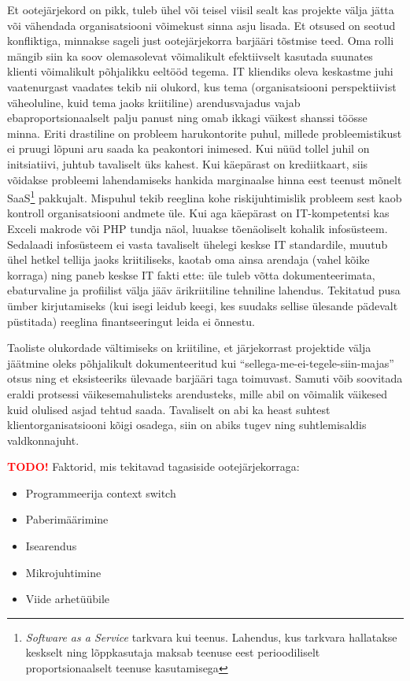 \documentclass{tufte-book}
\newcommand{\TODO}{\textcolor{red}{\bf TODO!}\xspace}
\begin{document}
Et ootejärjekord on pikk, tuleb ühel või teisel viisil sealt kas projekte välja jätta või vähendada organisatsiooni võimekust sinna asju lisada. Et otsused on seotud konfliktiga, minnakse sageli just ootejärjekorra barjääri tõstmise teed. Oma rolli mängib siin ka soov olemasolevat võimalikult efektiivselt kasutada suunates klienti võimalikult põhjalikku eeltööd tegema. IT kliendiks oleva keskastme juhi vaatenurgast vaadates tekib nii olukord, kus tema (organisatsiooni perspektiivist väheoluline, kuid tema jaoks kriitiline) arendusvajadus vajab ebaproportsionaalselt palju panust ning omab ikkagi väikest shanssi töösse minna. Eriti drastiline on probleem harukontorite puhul, millede probleemistikust ei pruugi lõpuni aru saada ka peakontori inimesed. Kui nüüd tollel juhil on initsiatiivi, juhtub tavaliselt üks kahest. Kui käepärast on krediitkaart, siis võidakse probleemi lahendamiseks hankida marginaalse hinna eest teenust mõnelt SaaS\footnote{\emph{Software as a Service} tarkvara kui teenus. Lahendus, kus tarkvara hallatakse keskselt ning lõppkasutaja maksab teenuse eest perioodiliselt proportsionaalselt teenuse kasutamisega} pakkujalt. Mispuhul tekib reeglina kohe riskijuhtimislik probleem sest kaob kontroll organisatsiooni andmete üle. Kui aga käepärast on IT-kompetentsi kas Exceli makrode või PHP tundja näol, luuakse tõenäoliselt kohalik infosüsteem. Sedalaadi infosüsteem ei vasta tavaliselt ühelegi keskse IT standardile, muutub ühel hetkel tellija jaoks kriitiliseks, kaotab oma ainsa arendaja (vahel kõike korraga) ning paneb keskse IT fakti ette: üle tuleb võtta dokumenteerimata, ebaturvaline ja profiilist välja jääv ärikriitiline tehniline lahendus. Tekitatud pusa ümber kirjutamiseks (kui isegi leidub keegi, kes suudaks sellise ülesande pädevalt püstitada) reeglina finantseeringut leida ei õnnestu. 

Taoliste olukordade vältimiseks on kriitiline, et järjekorrast projektide välja jäätmine oleks põhjalikult dokumenteeritud kui \enquote{sellega-me-ei-tegele-siin-majas} otsus ning et eksisteeriks ülevaade barjääri taga toimuvast. Samuti võib soovitada eraldi protsessi väikesemahulisteks arendusteks, mille abil on võimalik väikesed kuid olulised asjad tehtud saada. Tavaliselt on abi ka heast suhtest klientorganisatsiooni kõigi osadega, siin on abiks tugev ning suhtlemisaldis valdkonnajuht.

\TODO Faktorid, mis tekitavad tagasiside ootejärjekorraga:
\begin{itemize}
	\item Programmeerija context switch
	\item Paberimäärimine
	\item Isearendus
	\item Mikrojuhtimine
	\item Viide arhetüübile
\end{itemize}
\end{document}
